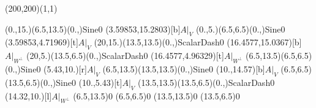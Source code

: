 \unitlength=1bp%

\begin{feynartspicture}(200,200)(1,1)

\FADiagram{}
\FAProp(0.,15.)(6.5,13.5)(0.,){Sine}{0}
\FALabel(3.59853,15.2803)[b]{$A|_V$}
\FAProp(0.,5.)(6.5,6.5)(0.,){Sine}{0}
\FALabel(3.59853,4.71969)[t]{$A|_V$}
\FAProp(20,15.)(13.5,13.5)(0.,){ScalarDash}{0}
\FALabel(16.4577,15.0367)[b]{$A|_{W^\perp}$}
\FAProp(20,5.)(13.5,6.5)(0.,){ScalarDash}{0}
\FALabel(16.4577,4.96329)[t]{$A|_{W^\perp}$}
\FAProp(6.5,13.5)(6.5,6.5)(0.,){Sine}{0}
\FALabel(5.43,10.)[r]{$A|_V$}
\FAProp(6.5,13.5)(13.5,13.5)(0.,){Sine}{0}
\FALabel(10.,14.57)[b]{$A|_V$}
\FAProp(6.5,6.5)(13.5,6.5)(0.,){Sine}{0}
\FALabel(10.,5.43)[t]{$A|_V$}
\FAProp(13.5,13.5)(13.5,6.5)(0.,){ScalarDash}{0}
\FALabel(14.32,10.)[l]{$A|_{W^\perp}$}
\FAVert(6.5,13.5){0}
\FAVert(6.5,6.5){0}
\FAVert(13.5,13.5){0}
\FAVert(13.5,6.5){0}
\end{feynartspicture}

